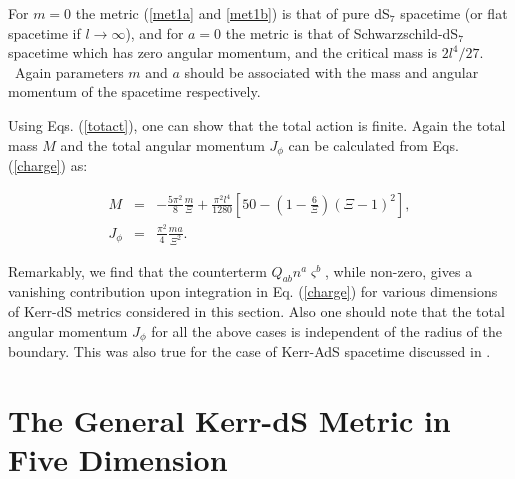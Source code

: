 \documentclass[a4paper,12pt,onecolumn]{revtex4}
\begin{document}
For $m=0$ the metric (\ref{met1a} and \ref{met1b}) is that of pure dS$_7$
spacetime (or flat spacetime if $l\rightarrow \infty $), and for $a=0$ the
metric is that of Schwarzschild-dS$_7$ spacetime which has zero angular
momentum, and the critical mass is $2l^4/27$. \ Again parameters $m$ and $a$
should be associated with the mass and angular momentum of the spacetime
respectively.

Using Eqs. (\ref{totact}), one can show that the total action is finite.
Again the total mass $M$ and the total angular momentum $J_\phi $ can be
calculated from Eqs. (\ref{charge}) as:

\begin{eqnarray*}
M &=&-\frac{5\pi ^2}8\frac m\Xi +\frac{\pi
^2l^4}{1280}\left[50-(1-\frac 6\Xi
)(\Xi -1)^2\right], \\
J_\phi  &=&\frac{\pi ^2}4\frac{ma}{\Xi ^2}.
\end{eqnarray*}

Remarkably, we find that the counterterm $Q_{ab}n^a\varsigma ^b$,
while non-zero, gives a vanishing contribution upon integration in
Eq. (\ref{charge}) for various dimensions of Kerr-dS metrics
considered in this section. Also one should note that the total
angular momentum $J_\phi $ for all the above cases is independent
of the radius of the boundary. This was also true for the case of
Kerr-AdS spacetime discussed in \cite{Deh1}.

\section{The General Kerr-dS Metric in Five Dimension}
\end{document}
